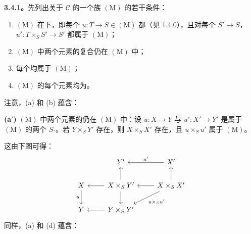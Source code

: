 \textbf{3.4.1。}先列出关于 $\mathcal C$ 的一个族 $(\mathrm M)$ 的若干条件：
\begin{enumerate}
\item[(a)] $(\mathrm M)$ 在下，即每个 $u:T\to S\in(\mathrm M)$ 都（见 1.4.0），且对每个 $S'\to S$，$u':T\times_S S'\to S'$ 都属于 $(\mathrm M)$；
\item[(b)] $(\mathrm M)$ 中两个元素的复合仍在 $(\mathrm M)$ 中；
\item[(c)] 每个均属于 $(\mathrm M)$；
\item[(d)] $(\mathrm M)$ 的每个元素均为。
\end{enumerate}
注意，(a) 和 (b) 蕴含：

\textbf{(a$'$)} $(\mathrm M)$ 中两个元素的仍在 $(\mathrm M)$ 中：设 $u:X\to Y$ 与 $u':X'\to Y'$ 是属于 $(\mathrm M)$ 的两个 $S$-。若 $Y\times_S Y'$ 存在，则 $X\times_S X'$ 存在，且 $u\times_S u'$ 属于 $(\mathrm M)$。

这由下图可得：
\[
\begin{tikzcd}
&Y'&X'\arrow[l,"u'"']\\
X\arrow[d,"u"']&X\times_S Y'\arrow[l]\arrow[u]\arrow[d]&X\times_S X'\arrow[l]\arrow[u]\arrow[dl,"u\times_S u'"]\\
Y&Y\times_S Y'\arrow[l]
\end{tikzcd}
\]
同样，(a) 和 (d) 蕴含：

